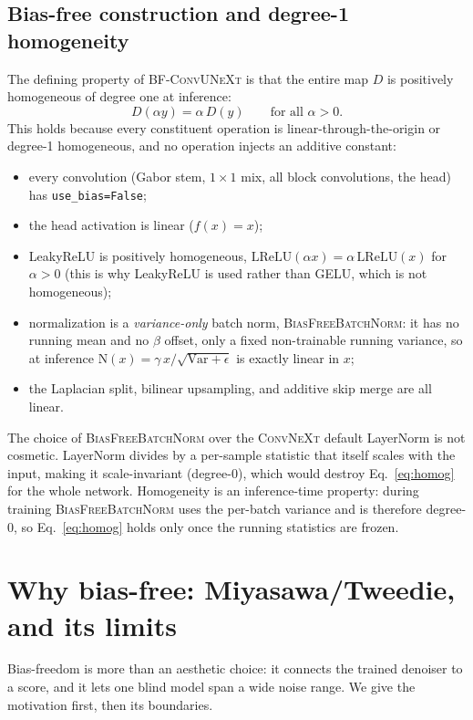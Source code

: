 \documentclass{article}
\newcommand{\model}{\textsc{BF-ConvUNeXt}}
\newcommand{\convnext}{\textsc{ConvNeXt}}
\newcommand{\bfbn}{\textsc{BiasFreeBatchNorm}}
\begin{document}
\subsection{Bias-free construction and degree-1 homogeneity}
\label{sec:biasfree}
The defining property of \model{} is that the entire map $D$ is positively homogeneous of degree one at inference:
\begin{equation}
D(\alpha y) = \alpha\, D(y) \qquad \text{for all } \alpha > 0.
\label{eq:homog}
\end{equation}
This holds because every constituent operation is linear-through-the-origin or degree-1 homogeneous, and no operation injects an additive constant:
\begin{itemize}
  \item every convolution (Gabor stem, $1{\times}1$ mix, all block convolutions, the head) has \texttt{use\_bias=False};
  \item the head activation is linear ($f(x)=x$);
  \item LeakyReLU is positively homogeneous, $\mathrm{LReLU}(\alpha x)=\alpha\,\mathrm{LReLU}(x)$ for $\alpha>0$ (this is why LeakyReLU is used rather than GELU, which is not homogeneous);
  \item normalization is a \emph{variance-only} batch norm, \bfbn{}: it has no running mean and no $\beta$ offset, only a fixed non-trainable running variance, so at inference $\mathrm{N}(x) = \gamma\, x / \sqrt{\mathrm{Var}+\epsilon}$ is exactly linear in $x$;
  \item the Laplacian split, bilinear upsampling, and additive skip merge are all linear.
\end{itemize}
The choice of \bfbn{} over the \convnext{} default LayerNorm is not cosmetic. LayerNorm divides by a per-sample statistic that itself scales with the input, making it scale-invariant (degree-0), which would destroy Eq.~\eqref{eq:homog} for the whole network. Homogeneity is an inference-time property: during training \bfbn{} uses the per-batch variance and is therefore degree-0, so Eq.~\eqref{eq:homog} holds only once the running statistics are frozen.

\section{Why bias-free: Miyasawa/Tweedie, and its limits}
\label{sec:theory}

Bias-freedom is more than an aesthetic choice: it connects the trained denoiser to a score, and it lets one blind model span a wide noise range. We give the motivation first, then its boundaries.
\end{document}
